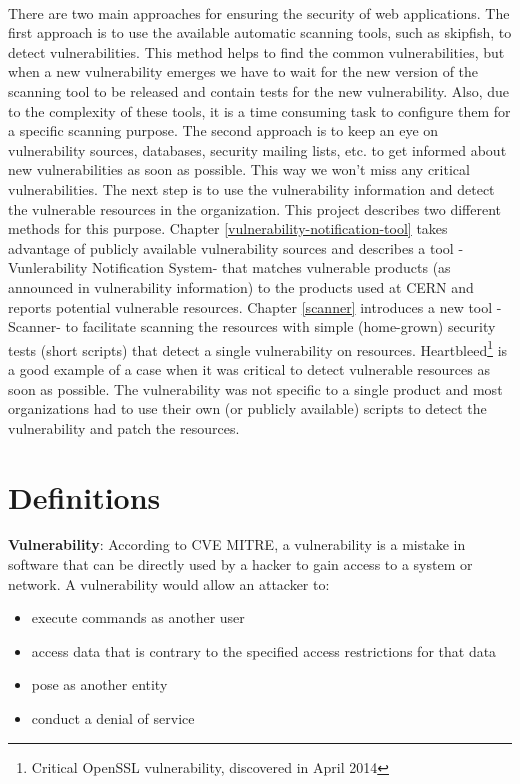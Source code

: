\paragraph{}
There are two main approaches for ensuring the security of web applications. The first approach is to use the available automatic scanning tools, such as skipfish, to detect vulnerabilities. This method helps to find the common vulnerabilities, but when a new vulnerability emerges we have to wait for the new version of the scanning tool to be released and contain tests for the new vulnerability. Also, due to the complexity of these tools, it is a time consuming task to configure them for a specific scanning purpose. 
The second approach is to keep an eye on vulnerability sources, databases, security mailing lists, etc. to get informed about new vulnerabilities as soon as possible. This way we won't miss any critical vulnerabilities. The next step is to use the vulnerability information and detect the vulnerable resources in the organization. This project describes two different methods for this purpose. Chapter \ref{vulnerability-notification-tool} takes advantage of publicly available vulnerability sources and describes a tool -Vunlerability Notification System- that matches  vulnerable products (as announced in vulnerability information) to the products used at CERN and reports potential vulnerable resources. Chapter \ref{scanner} introduces a new tool -Scanner- to facilitate scanning the resources with simple (home-grown) security tests (short scripts) that detect a single vulnerability on resources. Heartbleed\footnote{Critical OpenSSL vulnerability, discovered in April 2014} is a good example of a case when it was critical to detect vulnerable resources as soon as possible. The vulnerability was not specific to a single product and most organizations had to use their own (or publicly available) scripts to detect the vulnerability and patch the resources.

\section{Definitions}

\textbf{Vulnerability}: According to CVE MITRE, a vulnerability is a mistake in software that can be directly used by a hacker to gain access to a system or network. A vulnerability would allow an attacker to:
\begin{itemize}
\item execute commands as another user
\item access data that is contrary to the specified access restrictions for that data
\item pose as another entity
\item conduct a denial of service
\end{itemize}

